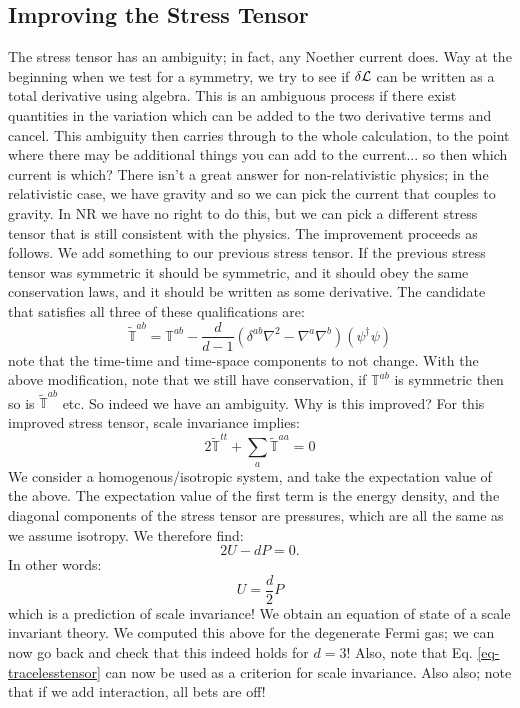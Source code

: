 \subsection{Improving the Stress Tensor}
The stress tensor has an ambiguity; in fact, any Noether current does. Way at the beginning when we test for a symmetry, we try to see if $\delta \mathcal{L}$ can be written as a total derivative using algebra. This is an ambiguous process if there exist quantities in the variation which can be added to the two derivative terms and cancel. This ambiguity then carries through to the whole calculation, to the point where there may be additional things you can add to the current... so then which current is which? There isn't a great answer for non-relativistic physics; in the relativistic case, we have gravity and so we can pick the current that couples to gravity. In NR we have no right to do this, but we can pick a different stress tensor that is still consistent with the physics. The improvement proceeds as follows. We add something to our previous stress tensor. If the previous stress tensor was symmetric it should be symmetric, and it should obey the same conservation laws, and it should be written as some derivative. The candidate that satisfies all three of these qualifications are:
\begin{equation}
    \tilde{\mathbb{T}}^{ab} = \mathbb{T}^{ab} - \frac{d}{d-1}\left(\delta^{ab}\nabla^2 - \nabla^a\nabla^b\right)(\psi^\dag\psi)
\end{equation}
note that the time-time and time-space components to not change. With the above modification, note that we still have conservation, if $ \mathbb{T}^{ab}$ is symmetric then so is $ \tilde{\mathbb{T}}^{ab}$ etc. So indeed we have an ambiguity. Why is this improved? For this improved stress tensor,  scale invariance implies:
\begin{equation}\label{eq-tracelesstensor}
    2\tilde{\mathbb{T}}^{tt} + \sum_a \tilde{\mathbb{T}}^{aa} = 0
\end{equation}
We consider a homogenous/isotropic system, and take the expectation value of the above. The expectation value of the first term is the energy density, and the diagonal components of the stress tensor are pressures, which are all the same as we assume isotropy. We therefore find:
\begin{equation}
    2U - dP = 0.
\end{equation}
In other words:
\begin{equation}
    U = \frac{d}{2}P
\end{equation}
which is a prediction of scale invariance! We obtain an equation of state of a scale invariant theory. We computed this above for the degenerate Fermi gas; we can now go back and check that this indeed holds for $d = 3$! Also, note that Eq. \eqref{eq-tracelesstensor} can now be used as a criterion for scale invariance. Also also; note that if we add interaction, all bets are off!

